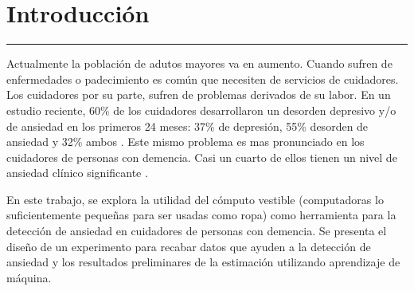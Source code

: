 
\chapter{Introducci\'on}\label{capit:cap1}
\vspace{-2.0325ex}%
\noindent
\rule{\textwidth}{0.5pt}
\vspace{-5.5ex}%
\newcommand{\pushline}{\Indp}


Actualmente la poblaci\'on de adutos mayores va en aumento. Cuando sufren de enfermedades o padecimiento es com\'un que necesiten de servicios de cuidadores. Los cuidadores por su parte, sufren de problemas derivados de su labor. En un estudio reciente, 60\% de los cuidadores desarrollaron un desorden depresivo y/o de ansiedad en los primeros 24 meses: 37\% de depresi\'on, 55\% desorden de ansiedad y 32\% ambos \citep{Joling2014}. Este mismo problema es mas pronunciado en los cuidadores de personas con demencia.  Casi un cuarto de ellos tienen un nivel de ansiedad cl\'inico significante \citep{Cooper200615}.

	En este trabajo, se explora la utilidad del c\'omputo vestible (computadoras lo suficientemente peque\~nas para ser usadas como ropa) como herramienta para la detecci\'on de ansiedad en cuidadores de personas con demencia. Se presenta el dise\~no de un experimento para recabar datos que ayuden a la detecci\'on de ansiedad y los resultados preliminares de la estimaci\'on utilizando aprendizaje de m\'aquina.
	
	
	
	
	

	

